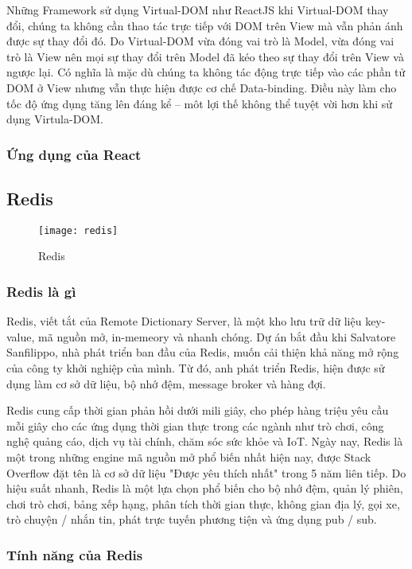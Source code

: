 Những Framework sử dụng Virtual-DOM như ReactJS khi Virtual-DOM thay đổi, chúng ta không cần thao tác trực tiếp với DOM trên View mà vẫn phản ánh được sự thay đổi đó. Do Virtual-DOM vừa đóng vai trò là Model, vừa đóng vai trò là View nên mọi sự thay đổi trên Model đã kéo theo sự thay đổi trên View và ngược lại. Có nghĩa là mặc dù chúng ta không tác động trực tiếp vào các phần tử DOM ở View nhưng vẫn thực hiện được cơ chế Data-binding. Điều này làm cho tốc độ ứng dụng tăng lên đáng kể – môt lợi thế không thể tuyệt vời hơn khi sử dụng Virtula-DOM.

\subsubsection{Ứng dụng của React}

\subsection{Redis}

\begin{figure}[ht]
	\centering
	\texttt{[image: redis]}
	\caption{Redis}
\end{figure}

\subsubsection{Redis là gì}

Redis, viết tắt của Remote Dictionary Server, là một kho lưu trữ dữ liệu key-value, mã nguồn mở, in-memeory và nhanh chóng. Dự án bắt đầu khi Salvatore Sanfilippo, nhà phát triển ban đầu của Redis, muốn cải thiện khả năng mở rộng của công ty khởi nghiệp của mình. Từ đó, anh phát triển Redis, hiện được sử dụng làm cơ sở dữ liệu, bộ nhớ đệm, message broker và hàng đợi.

Redis cung cấp thời gian phản hồi dưới mili giây, cho phép hàng triệu yêu cầu mỗi giây cho các ứng dụng thời gian thực trong các ngành như trò chơi, công nghệ quảng cáo, dịch vụ tài chính, chăm sóc sức khỏe và IoT. Ngày nay, Redis là một trong những engine mã nguồn mở phổ biến nhất hiện nay, được Stack Overflow đặt tên là cơ sở dữ liệu "Được yêu thích nhất" trong 5 năm liên tiếp. Do hiệu suất nhanh, Redis là một lựa chọn phổ biến cho bộ nhớ đệm, quản lý phiên, chơi trò chơi, bảng xếp hạng, phân tích thời gian thực, không gian địa lý, gọi xe, trò chuyện / nhắn tin, phát trực tuyến phương tiện và ứng dụng pub / sub.

\subsubsection{Tính năng của Redis}

